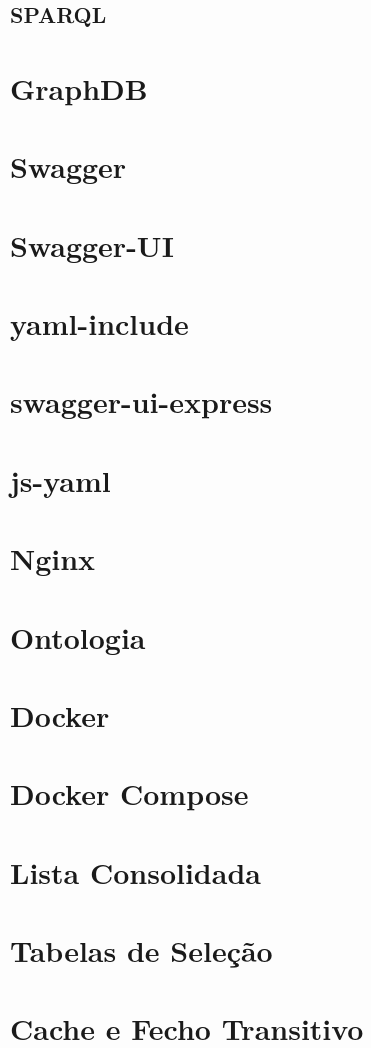 \subsection{SPARQL}
\cite{lsparql}


\section{GraphDB}

\section{Swagger}

\section{Swagger-UI}

\section{yaml-include}

\section{swagger-ui-express}

\section{js-yaml}

\section{Nginx}
\cite{nginxcook}

\section{Ontologia}
\cite{bontology}

\section{Docker}
\cite{udocker}

\section{Docker Compose}
\cite{udocker}

\section{Lista Consolidada}

\section{Tabelas de Seleção}

\section{Cache e Fecho Transitivo}
